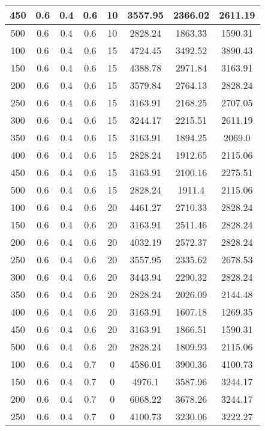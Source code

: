 \documentclass[a4paper, 12pt]{extreport}
\begin{document}
\begin{itemize}
\begin{longtable}{|c|c|c|c|c|c|c|c|}
			450 & 0.6 & 0.4 & 0.6 & 10 & 3557.95 & 2366.02 & 2611.19 \\\hline
			500 & 0.6 & 0.4 & 0.6 & 10 & 2828.24 & 1863.33 & 1590.31 \\\hline
			100 & 0.6 & 0.4 & 0.6 & 15 & 4724.45 & 3492.52 & 3890.43 \\\hline
			150 & 0.6 & 0.4 & 0.6 & 15 & 4388.78 & 2971.84 & 3163.91 \\\hline
			200 & 0.6 & 0.4 & 0.6 & 15 & 3579.84 & 2764.13 & 2828.24 \\\hline
			250 & 0.6 & 0.4 & 0.6 & 15 & 3163.91 & 2168.25 & 2707.05 \\\hline
			300 & 0.6 & 0.4 & 0.6 & 15 & 3244.17 & 2215.51 & 2611.19 \\\hline
			350 & 0.6 & 0.4 & 0.6 & 15 & 3163.91 & 1894.25 & 2069.0 \\\hline
			400 & 0.6 & 0.4 & 0.6 & 15 & 2828.24 & 1912.65 & 2115.06 \\\hline
			450 & 0.6 & 0.4 & 0.6 & 15 & 3163.91 & 2100.16 & 2275.51 \\\hline
			500 & 0.6 & 0.4 & 0.6 & 15 & 2828.24 & 1911.4 & 2115.06 \\\hline
			100 & 0.6 & 0.4 & 0.6 & 20 & 4461.27 & 2710.33 & 2828.24 \\\hline
			150 & 0.6 & 0.4 & 0.6 & 20 & 3163.91 & 2511.46 & 2828.24 \\\hline
			200 & 0.6 & 0.4 & 0.6 & 20 & 4032.19 & 2572.37 & 2828.24 \\\hline
			250 & 0.6 & 0.4 & 0.6 & 20 & 3557.95 & 2335.62 & 2678.53 \\\hline
			300 & 0.6 & 0.4 & 0.6 & 20 & 3443.94 & 2290.32 & 2828.24 \\\hline
			350 & 0.6 & 0.4 & 0.6 & 20 & 2828.24 & 2026.09 & 2144.48 \\\hline
			400 & 0.6 & 0.4 & 0.6 & 20 & 3163.91 & 1607.18 & 1269.35 \\\hline
			450 & 0.6 & 0.4 & 0.6 & 20 & 3163.91 & 1866.51 & 1590.31 \\\hline
			500 & 0.6 & 0.4 & 0.6 & 20 & 2828.24 & 1809.93 & 2115.06 \\\hline
			100 & 0.6 & 0.4 & 0.7 & 0 & 4586.01 & 3900.36 & 4100.73 \\\hline
			150 & 0.6 & 0.4 & 0.7 & 0 & 4976.1 & 3587.96 & 3244.17 \\\hline
			200 & 0.6 & 0.4 & 0.7 & 0 & 6068.22 & 3678.26 & 3244.17 \\\hline
			250 & 0.6 & 0.4 & 0.7 & 0 & 4100.73 & 3230.06 & 3222.27 \\\hline

\end{longtable}
\end{itemize}
\end{document}
